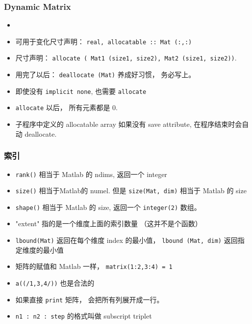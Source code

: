 \subsubsection{Dynamic Matrix}
\begin{itemize}
\item \item 可用于变化尺寸声明： \verb`real, allocatable :: Mat (:,:)`
\item 尺寸声明： \verb`allocate ( Mat1 (size1, size2), Mat2 (size1, size2))`.
\item 用完了以后： \verb`deallocate (Mat)` 养成好习惯， 务必写上。
\item 即使没有 \verb`implicit none`, 也需要 \verb`allocate`
\item \verb`allocate` 以后， 所有元素都是 0.
\item 子程序中定义的 allocatable array 如果没有 save attribute, 在程序结束时会自动 deallocate.
\end{itemize}

\subsubsection{索引}
\begin{itemize}
\item \verb`rank()` 相当于 Matlab 的 ndims, 返回一个 integer
\item \verb`size()` 相当于Matlab的 numel. 但是 \verb`size(Mat, dim)` 相当于 Matlab 的 size
\item \verb`shape()` 相当于 Matlab 的 size, 返回一个 \verb`integer(2)` 数组。
\item "extent" 指的是一个维度上面的索引数量 （这并不是个函数）
\item \verb`lbound(Mat)` 返回在每个维度 index 的最小值， \verb`lbound (Mat, dim)` 返回指定维度的最小值
\item 矩阵的赋值和 Matlab 一样， \verb`matrix(1:2,3:4) = 1`
\item \verb`a((/1,3,4/))` 也是合法的
\item 如果直接 \verb`print` 矩阵， 会把所有列展开成一行。
\item \verb`n1 : n2 : step` 的格式叫做 subscript triplet
\end{itemize}

